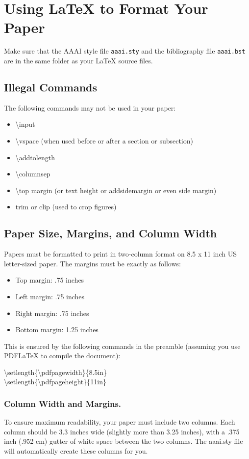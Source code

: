 \documentclass[letterpaper]{article}
\begin{document}
\section{Using \LaTeX{} to Format Your Paper}
Make sure that the AAAI style file \texttt{aaai.sty} and the bibliography file \texttt{aaai.bst} are in the same folder as your \LaTeX{} source files.

\subsection{Illegal Commands}
The following commands may not be used in your paper:
\begin{itemize}
\item \textbackslash input
\item \textbackslash vspace (when used before or after a section or subsection)
\item \textbackslash addtolength 
\item \textbackslash columnsep
\item \textbackslash top margin (or text height or addsidemargin or even side margin)
\item trim or clip (used to crop figures)
\end{itemize}

\subsection{Paper Size, Margins, and Column Width}
Papers must be formatted to print in two-column format on 8.5 x 11 inch US letter-sized paper. The margins must be exactly as follows: 
\begin{itemize}
\item Top margin: .75 inches
\item Left margin: .75 inches
\item Right margin: .75 inches
\item Bottom margin: 1.25 inches
\end{itemize} 
This is ensured by the following commands in the preamble (assuming you use PDF\LaTeX{} to compile the document):
\begin{center}
\textbackslash setlength\{\textbackslash pdfpagewidth\}\{8.5in\} \\
\textbackslash setlength\{\textbackslash pdfpageheight\}\{11in\}
\end{center}


\subsubsection{Column Width and Margins.}
To ensure maximum readability, your paper must include two columns. Each column should be 3.3 inches wide (slightly more than 3.25 inches), with a .375 inch (.952 cm) gutter of white space between the two columns. The aaai.sty file will automatically create these columns for you. 
\end{document}
